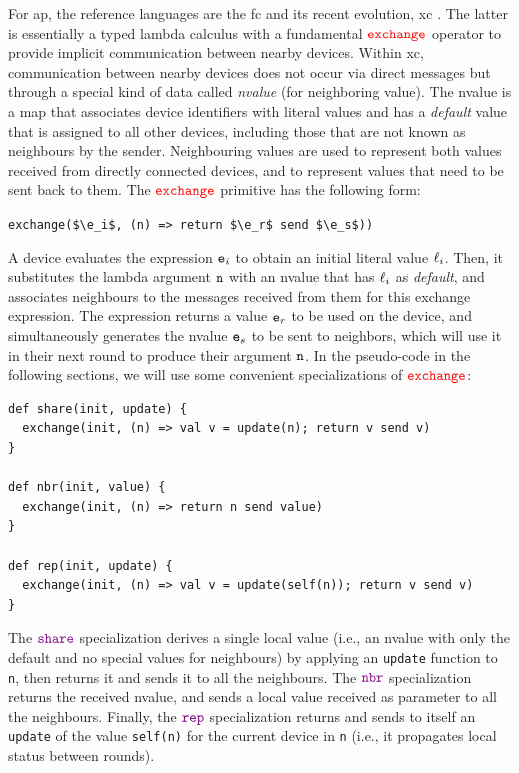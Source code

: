 \documentclass[runningheads]{llncs}
\begin{document}
For \ac{ap}, the reference languages are the \ac{fc} \cite{DBLP:journals/jlap/ViroliBDACP19} and its recent evolution, \ac{xc} \cite{jss:xc}. The latter is essentially a typed lambda calculus with a fundamental ${\color{red}\mathtt{exchange}}$ operator to provide implicit communication between nearby devices. Within \ac{xc}, communication between nearby devices does not occur via direct messages but through a special kind of data called \emph{nvalue} (for neighboring value). The nvalue is a map that associates device identifiers with literal values and has a \emph{default} value that is assigned to all other devices, including those that are not known as neighbours by the sender. Neighbouring values are used to represent both values received from directly connected devices, and to represent values that need to be sent back to them.
%
The ${\color{red}\mathtt{exchange}}$ primitive has the following form:
\begin{center}
\lstinline[mathescape,language=xc]
{exchange($\e_i$, (n) => return $\e_r$ send $\e_s$))}
\end{center}
A device evaluates the expression $\e_i$ to obtain an initial literal value $\ell_i$. Then, it substitutes the lambda argument
$\mathtt{n}$ with an nvalue that has $\ell_i$ as \emph{default}, and associates neighbours to the messages received from them for this exchange expression. The expression returns a value $\e_r$ to be used on the device, and simultaneously generates the nvalue $\e_s$ to be sent to neighbors, which will use it in their next round to produce their argument $\mathtt{n}$.
%
In the pseudo-code in the following sections, we will use some convenient specializations of ${\color{red}\mathtt{exchange}}$: 
\begin{lstlisting}[mathescape, language=xc]
def share(init, update) {
  exchange(init, (n) => val v = update(n); return v send v)
}

def nbr(init, value) {
  exchange(init, (n) => return n send value)
}

def rep(init, update) {
  exchange(init, (n) => val v = update(self(n)); return v send v)
}
\end{lstlisting}
The ${{\color{violet}\mathtt{share}}}$ specialization derives a single local value (i.e., an nvalue with only the default and no special values for neighbours) by applying an {\tt update} function to {\tt n}, then returns it and sends it to all the neighbours.
The ${{\color{violet}\mathtt{nbr}}}$ specialization returns the received nvalue, and sends a local value received as parameter to all the neighbours.
Finally, the ${{\color{violet}\mathtt{rep}}}$ specialization returns and sends to itself an {\tt update} of the value \lstinline[language=xc]|self(n)| for the current device in {\tt n} (i.e., it propagates local status between rounds).
\end{document}
